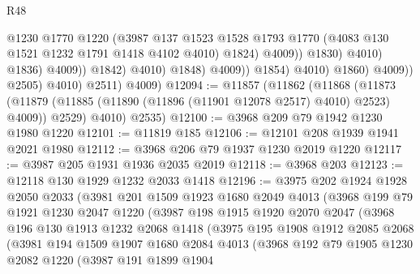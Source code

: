 \begin{lexlean}{R48}
\begin{coremodule}
                                              @1230
                                              @1770
                                              @1220
                                              (@3987
                                                @137
                                                @1523
                                                @1528
                                                @1793
                                                @1770
                                                (@4083 @130 @1521 @1232 @1791 @1418 @4102 @4010)
                                                @1824)
                                              @4009))
                                          @1830)
                                        @4010)
                                      @1836)
                                    @4009))
                                @1842)
                              @4010)
                            @1848)
                          @4009))
                      @1854)
                    @4010)
                  @1860)
                @4009))
            @2505)
          @4010)
        @2511)
      @4009)
@12094 := @11857
    (@11862
      (@11868
        (@11873 (@11879 (@11885 (@11890 (@11896 (@11901 @12078 @2517) @4010) @2523) @4009)) @2529)
        @4010)
      @2535)
@12100 := @3968 @209 @79 @1942 @1230 @1980 @1220
@12101 := @11819 @185
@12106 := @12101 @208 @1939 @1941 @2021 @1980
@12112 := @3968 @206 @79 @1937 @1230 @2019 @1220
@12117 := @3987 @205 @1931 @1936 @2035 @2019
@12118 := @3968 @203
@12123 := @12118 @130 @1929 @1232 @2033 @1418
@12196 := @3975
    @202
    @1924
    @1928
    @2050
    @2033
    (@3981
      @201
      @1509
      @1923
      @1680
      @2049
      @4013
      (@3968
        @199
        @79
        @1921
        @1230
        @2047
        @1220
        (@3987
          @198
          @1915
          @1920
          @2070
          @2047
          (@3968
            @196
            @130
            @1913
            @1232
            @2068
            @1418
            (@3975
              @195
              @1908
              @1912
              @2085
              @2068
              (@3981
                @194
                @1509
                @1907
                @1680
                @2084
                @4013
                (@3968
                  @192
                  @79
                  @1905
                  @1230
                  @2082
                  @1220
                  (@3987
                    @191
                    @1899
                    @1904

\end{coremodule}
\end{lexlean}
